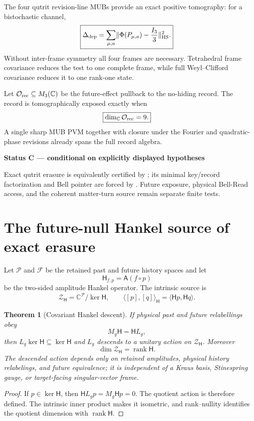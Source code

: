 \documentclass[11pt,oneside,openany]{book}
\numberwithin{equation}{chapter}
\newtheorem{theorem}{Theorem}[chapter]
\theoremstyle{definition}
\theoremstyle{remark}
\newcommand{\C}{\mathbb C}
\newcommand{\rank}{\operatorname{rank}}
\newcommand{\norm}[1]{\lVert #1\rVert}
\newenvironment{statusbox}[2]{%
  \par\medskip\noindent
  \begin{center}\begin{minipage}{0.94\textwidth}
  \colorbox{#1!8}{\parbox{\dimexpr\linewidth-2\fboxsep\relax}{\textbf{#2}}}\par\smallskip
}{%
  \end{minipage}\end{center}\medskip
}
\newcommand{\Conditional}[1]{\begin{statusbox}{CondColor}{Status C --- conditional on explicitly displayed hypotheses}#1\end{statusbox}}
\begin{document}
The four qutrit revision-line MUBs provide an exact positive tomography:
for a bistochastic channel,
\[
 \boxed{
 \Delta_{\rm dep}
 =
 \sum_{\mu,a}
 \norm{
 \Phi(P_{\mu,a})-\frac{I_3}{3}
 }_{\rm HS}^2.}
\]
Without inter-frame symmetry all four frames are necessary.  Tetrahedral
frame covariance reduces the test to one complete frame, while full
Weyl--Clifford covariance reduces it to one rank-one state.

Let \(\mathcal O_{\rm rec}\subseteq M_3(\C)\) be the future-effect pullback
to the no-hiding record.  The record is tomographically exposed exactly when
\[
 \boxed{\dim_\C\mathcal O_{\rm rec}=9.}
\]
A single sharp MUB PVM together with closure under the Fourier and
quadratic-phase revisions already spans the full record algebra.

\Conditional{Exact qutrit erasure is equivalently certified by
\Cref{thm:v6-erasure}; its minimal key/record factorization and Bell pointer are
forced by \Cref{thm:v6-no-hiding}.  Future exposure, physical Bell-Read access,
and the coherent matter-turn source remain separate finite tests.}


\section{The future-null Hankel source of exact erasure}
\label{sec:v5-erasure-hankel}

Let \(\mathscr P\) and \(\mathscr F\) be the retained past and future history
spaces and let
\[
 \mathsf H_{f,p}=\mathsf A(f\circ p)
\]
be the two-sided amplitude Hankel operator.  The intrinsic source is
\[
 \mathcal Z_{\mathsf H}
 =\C^{\mathscr P}/\ker\mathsf H,
 \qquad
 \langle[p],[q]\rangle_{\mathsf H}
 =\langle\mathsf Hp,\mathsf Hq\rangle.
\]

\begin{theorem}[Covariant Hankel descent]
\label{thm:v5-hankel-descent}
If physical past and future relabellings obey
\[
 M_g\mathsf H=\mathsf H L_g,
\]
then \(L_g\ker\mathsf H\subseteq\ker\mathsf H\) and \(L_g\) descends to a
unitary action on \(\mathcal Z_{\mathsf H}\).  Moreover
\[
 \boxed{\dim\mathcal Z_{\mathsf H}=\rank\mathsf H.}
\]
The descended action depends only on retained amplitudes, physical history
relabelings, and future equivalence; it is independent of a Kraus basis,
Stinespring gauge, or target-facing singular-vector frame.
\end{theorem}

\begin{proof}
If \(p\in\ker\mathsf H\), then
\(\mathsf HL_gp=M_g\mathsf Hp=0\).  The quotient action is therefore defined.
The intrinsic inner product makes it isometric, and rank--nullity identifies
the quotient dimension with \(\rank\mathsf H\).
\end{proof}
\end{document}

